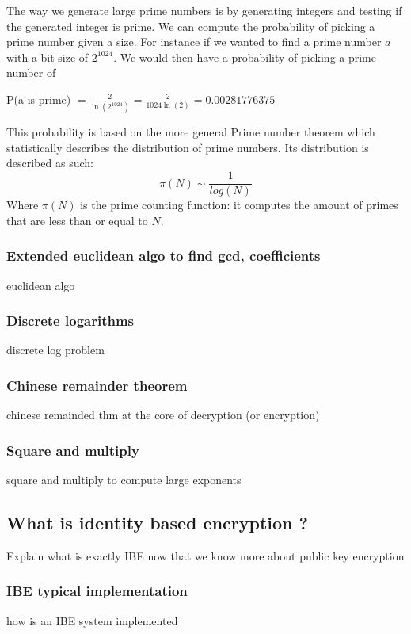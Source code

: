 \documentclass[conference]{IEEEtran}
\begin{document}
The way we generate large prime numbers is by generating integers and testing if the generated integer is
prime. We can compute the probability of picking a prime number given a size. For instance if we wanted to 
find a prime number $a$ with a bit size of $2^{1024}$. We would then have a probability of picking a prime
number of \\
\begin{center}
    P(a is prime) $= \frac{2}{\ln(2^{1024})} = \frac{2}{1024\ln(2)} = 0.00281776375$
\end{center}
This probability is based on the more general Prime number theorem which statistically describes the distribution of prime numbers.
Its distribution is described as such:
\begin{equation*}
    \pi(N) \sim \frac{1}{log(N)}
\end{equation*}
Where $\pi(N)$ is the prime counting function: it computes the amount of primes
that are less than or equal to $N$.
\\
\subsubsection{Extended euclidean algo to find gcd, coefficients}
euclidean algo


\subsubsection{Discrete logarithms}
discrete log problem

\subsubsection{Chinese remainder theorem}
chinese remainded thm at the core of decryption (or encryption)

\subsubsection{Square and multiply}
square and multiply to compute large exponents

\subsection{What is identity based encryption ?}
Explain what is exactly IBE now that we know more about public key encryption

\subsubsection{IBE typical implementation}
how is an IBE system implemented
\end{document}
